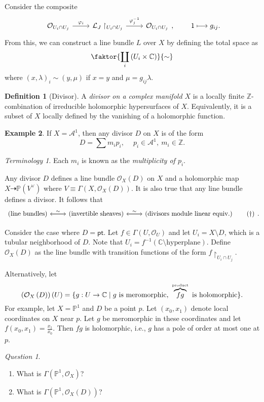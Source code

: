 \documentclass[10pt,letterpaper,cm]{nupset}
\theoremstyle{definition}
\newtheorem{defn}{Definition}[subsection]
\newtheorem{exmp}[defn]{Example}
\theoremstyle{theorem}
\theoremstyle{remark}
\newtheorem*{question}{Question}
\newtheorem*{term}{Terminology}
\newcommand{\A}{\mathcal A}
\newcommand{\C}{\mathbb C}
\renewcommand{\L}{\mathcal L}
\renewcommand{\O}{\mathcal O}
\renewcommand{\P}{\mathbb P}
\newcommand{\Z}{\mathbb Z}
\newcommand{\1}{\mathbb{1}}
\newcommand{\0}{\vec 0}
\newcommand{\pt}{\mathsf{pt}}
\newcommand{\be}{\begin{enumerate}}
\newcommand{\ee}{\end{enumerate}}
\begin{document}
Consider the composite
\[
\begin{tikzcd}
\O_{U_i \cap U_j} \arrow[r, "\varphi_i"] & \L_J\restriction_{U_i \cap U_j} \arrow[r, "\varphi_j^{-1}"] & \O_{U_i \cap U_j}
\end{tikzcd}
, \ \quad \quad 1 \longmapsto g_{ij}.
\] From this, we can construct a line bundle $L$ over $X$ by defining the total space as 
\[
\faktor{\coprod_i\left(U_i \times \C\right)}{\sim}
\] where $\left(x, \lambda \right)_i \sim \left(y, \mu\right)$ if $x=y$ and $\mu = g_{ij}\lambda$. 

\medskip

\begin{defn}[Divisor]
A \textit{divisor on a complex manifold $X$} is a locally finite $\Z$-combination of irreducible holomorphic hypersurfaces of $X$. Equivalently, it is a subset of $X$ locally defined  by the vanishing of a holomorphic function.
\end{defn}

\begin{exmp}
If $X = \A^1$, then any divisor $D$ on $X$ is of the form $$D = \sum m_ip_i, \ \quad p_i \in \A^1, \ m_i \in \Z.$$ 
\end{exmp}

\begin{term}
Each $m_i$ is known as the \textit{multiplicity of $p_i$}.
\end{term}

Any divisor $D$ defines a line bundle $\O_X(D)$ on $X$ and a holomorphic map $X \dashrightarrow \P\left(V^{\vee}\right)$ where $V\equiv \Gamma\left(X, \O_X(D)\right)$. It is also true that any line bundle defines a divisor. It follows that
\[
\begin{tikzcd} 
\label{eqn:corr}
\left(\text{line bundles}\right) \arrow[r] & \left(\text{invertible sheaves}\right) \arrow[l, "\sim"'] \arrow[r] & \left(\text{divisors module linear equiv.}\right) \arrow[l, "\sim"'] \tag{$\dagger$}
\end{tikzcd}.
\]

\medskip

Consider the case where $D = \pt$. Let $f \in \Gamma\left(U, \O_U\right)$ and let $U_i = X \setminus D$, which is a tubular neighborhood of $D$. Note that $U_i = f^{-1}\left (\C\setminus\text{hyperplane}\right)$. Define $\O_X(D)$ as the line bundle with transition functions of the form $f \restriction_{U_i \cap U_j}$.

\medskip

Alternatively, let $$\left(\O_X\left(D\right)\right)\left(U\right) = \{g : U \to \C  \mid g \text{ is meromorphic}, \ \overbrace{fg}^{\text{\tiny product}} \text{ is holomorphic}\}.$$
For example,
let $X = \P^1$ and $D$ be a point $p$. Let $(x_0, x_1)$ denote local coordinates on $X$ near $p$. Let $g$ be meromorphic in these coordinates and let $f\left(x_0, x_1\right) = \frac{x_1}{x_0}$. Then $f{g}$ is holomorphic, i.e., $g$ has a pole of order at most one at $p$. 
\begin{question} $ $
\be
\item What is $\Gamma\left(\P^1, \O_X\right)$?
\item What is $\Gamma\left(\P^1, \O_X\left(D\right)\right)$?
\ee
\end{question}
\end{document}
